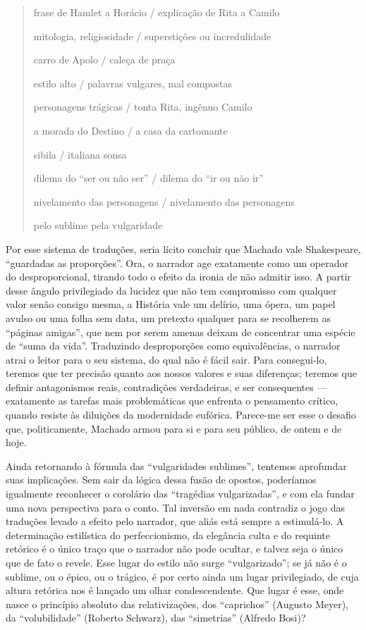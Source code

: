\begin{quote}
frase de Hamlet a Horácio / explicação de Rita a Camilo

mitologia, religiosidade / superstições ou incredulidade

carro de Apolo / caleça de praça

estilo alto / palavras vulgares, mal compostas

personagens trágicas / tonta Rita, ingênuo Camilo

a morada do Destino / a casa da cartomante

sibila / italiana sonsa

dilema do ``ser ou não ser'' / dilema do ``ir ou não ir''

nivelamento das personagens / nivelamento das personagens

pelo sublime pela vulgaridade
\end{quote}

Por esse sistema de traduções, seria lícito concluir que Machado vale
Shakespeare, ``guardadas as proporções''. Ora, o narrador age exatamente
como um operador do desproporcional, tirando todo o efeito da ironia de
não admitir isso. A partir desse ângulo privilegiado da lucidez que não
tem compromisso com qualquer valor senão consigo mesma, a História vale
um delírio, uma ópera, um papel avulso ou uma folha sem data, um
pretexto qualquer para se recolherem as ``páginas amigas'', que nem por
serem amenas deixam de concentrar uma espécie de ``suma da vida''.
Traduzindo desproporções como equivalências, o narrador atrai o leitor
para o seu sistema, do qual não é fácil sair. Para consegui-lo, teremos
que ter precisão quanto aos nossos valores e suas diferenças; teremos
que definir antagonismos reais, contradições verdadeiras, e ser
consequentes --- exatamente as tarefas mais problemáticas que enfrenta o
pensamento crítico, quando resiste às diluições da modernidade eufórica.
Parece-me ser esse o desafio que, politicamente, Machado armou para si e
para seu público, de ontem e de hoje.

Ainda retornando à fórmula das ``vulgaridades sublimes'', tentemos
aprofundar suas implicações. Sem sair da lógica dessa fusão de opostos,
poderíamos igualmente reconhecer o corolário das ``tragédias
vulgarizadas'', e com ela fundar uma nova perspectiva para o conto. Tal
inversão em nada contradiz o jogo das traduções levado a efeito pelo
narrador, que aliás está sempre a estimulá-lo. A determinação
estilística do perfeccionismo, da elegância culta e do requinte retórico
é o único traço que o narrador não pode ocultar, e talvez seja o único
que de fato o revele. Esse lugar do estilo não surge ``vulgarizado''; se
já não é o sublime, ou o épico, ou o trágico, é por certo ainda um lugar
privilegiado, de cuja altura retórica nos é lançado um olhar
condescendente. Que lugar é esse, onde nasce o princípio absoluto das
relativizações, dos ``caprichos'' (Augusto Meyer), da ``volubilidade''
(Roberto Schwarz), das ``simetrias'' (Alfredo Bosi)?

